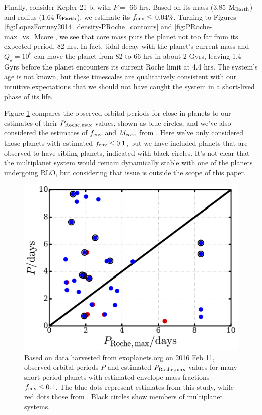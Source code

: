 \documentclass{svjour3}                     %
\begin{document}
Finally, consider Kepler-21 b, with $P =$ 66 hrs. Based on its mass (3.85 ${\rm M_{Earth}}$) and radius (1.64 ${\rm R_{Earth}}$), we estimate its $f_{\rm env} \le$ 0.04\%. Turning to Figures \ref{fig:LopezFortney2014_density-PRoche_contours} and \ref{fig:PRoche-max_vs_Mcore}, we see that core mass puts the planet not too far from its expected period, 82 hrs. In fact, tidal decay with the planet's current mass and $Q_\star = 10^5$ can move the planet from 82 to 66 hrs in about 2 Gyrs, leaving 1.4 Gyrs before the planet encounters its current Roche limit at 4.4 hrs. The system's age is not known, but these timescales are qualitatively consistent with our intuitive expectations that we should not have caught the system in a short-lived phase of its life.

Figure \ref{fig:P_vs_PRoche-max} compares the observed orbital periods for close-in planets to our estimates of their $P_{\rm Roche, max}$-values, shown as blue circles, and we've also considered the estimates of $f_{\rm env}$ and $M_{\rm core}$ from \cite{Lopez2014Understanding}. Here we've only considered those planets with estimated $f_{\rm env} \le 0.1$, but we have included planets that are observed to have sibling planets, indicated with black circles. It's not clear that the multiplanet system would remain dynamically stable with one of the planets undergoing RLO, but considering that issue is outside the scope of this paper.

\begin{figure}
\includegraphics[width=\textwidth]{P_vs_PRoche-max}
\caption{Based on data harvested from exoplanets.org on 2016 Feb 11, observed orbital periods $P$ and estimated $P_{\rm Roche, max}$-values for many short-period planets with estimated envelope mass fractions $f_{\rm env} \le 0.1$. The blue dots represent estimates from this study, while red dots those from \cite{Lopez2014Understanding}. Black circles show members of multiplanet systems.}
\label{fig:P_vs_PRoche-max}
\end{figure}
\end{document}
